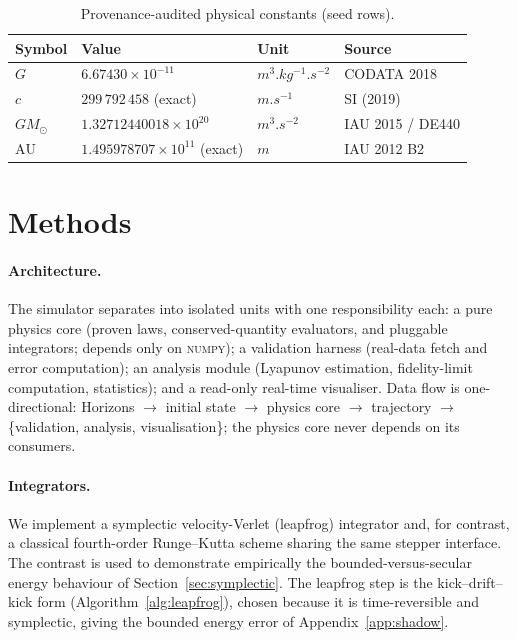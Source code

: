 \documentclass[11pt]{article}
\theoremstyle{definition}
\begin{document}
\begin{table}[h]
\centering
\begin{tabular}{llll}
\toprule
Symbol & Value & Unit & Source \\
\midrule
$G$ & $6.67430\times10^{-11}$ & $\si{m^3.kg^{-1}.s^{-2}}$ & CODATA 2018 \\
$c$ & $299\,792\,458$ (exact) & $\si{m.s^{-1}}$ & SI (2019) \\
$GM_\odot$ & $1.32712440018\times10^{20}$ & $\si{m^3.s^{-2}}$ & IAU 2015 / DE440 \\
$\mathrm{AU}$ & $1.495978707\times10^{11}$ (exact) & $\si{m}$ & IAU 2012 B2 \\
\bottomrule
\end{tabular}
\caption{Provenance-audited physical constants (seed rows).}
\label{tab:constants}
\end{table}

\section{Methods}
\label{sec:methods}

\paragraph{Architecture.}
The simulator separates into isolated units with one responsibility each: a pure
physics core (proven laws, conserved-quantity evaluators, and pluggable
integrators; depends only on \textsc{numpy}); a validation harness (real-data
fetch and error computation); an analysis module (Lyapunov estimation,
fidelity-limit computation, statistics); and a read-only real-time visualiser.
Data flow is one-directional: Horizons $\to$ initial state $\to$ physics core
$\to$ trajectory $\to$ \{validation, analysis, visualisation\}; the physics core
never depends on its consumers.

\paragraph{Integrators.}
We implement a symplectic velocity-Verlet (leapfrog) integrator and, for
contrast, a classical fourth-order Runge--Kutta scheme sharing the same stepper
interface. The contrast is used to demonstrate empirically the
bounded-versus-secular energy behaviour of Section~\ref{sec:symplectic}. The
leapfrog step is the kick--drift--kick form (Algorithm~\ref{alg:leapfrog}),
chosen because it is time-reversible and symplectic, giving the bounded energy
error of Appendix~\ref{app:shadow}.
\end{document}
